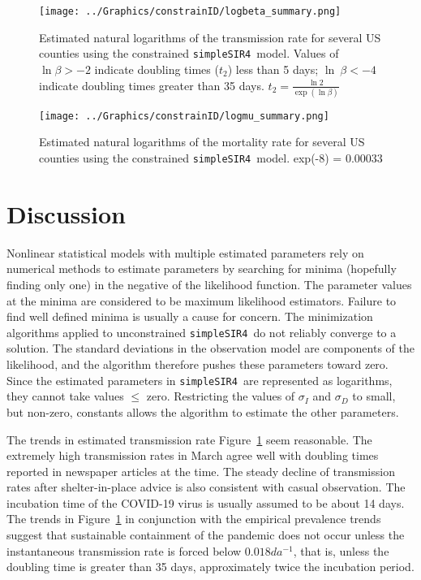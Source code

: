 \documentclass[12pt,letterpaper]{article}
\newcommand\help[1]{\color{Magenta}{\it #1 }\normalcolor}
\newcommand\SSm{{\tt simpleSIR4}}
\begin{document}
\begin{figure}
\begin{center}
\texttt{[image: ../Graphics/constrainID/logbeta\_summary.png]}\\
\end{center}
\caption{\label{fig:xrates}
Estimated natural logarithms of the transmission rate for several US counties using the
constrained \SSm\ model.
Values of $\ln \beta > -2$ indicate doubling times ($t_2$) less than 5 days;
$\ln~ \beta < -4$ indicate doubling times greater than 35 days.
$t_2 = \frac{\ln 2}{\exp(\ln \beta)}$
}
\end{figure}

\begin{figure}
\begin{center}
\texttt{[image: ../Graphics/constrainID/logmu\_summary.png]}\\
\end{center}
\caption{\label{fig:drates}
Estimated natural logarithms of the mortality rate for several US counties using the
constrained \SSm\ model.
exp(-8) = 0.00033
\help{Remove ToNY, Tompkins Co NY}
}
\end{figure}

\section*{Discussion}

Nonlinear statistical models with multiple estimated parameters rely
on numerical methods to estimate parameters by searching for minima
(hopefully finding only one) in the negative of the likelihood
function. The parameter values at the minima are considered to be
maximum likelihood estimators. Failure to find well defined minima is
usually a cause for concern. The minimization algorithms applied to
unconstrained \SSm\ do not reliably converge to a solution. The
standard deviations in the observation model are components of the
likelihood, and the algorithm therefore pushes these parameters toward zero.
Since the estimated parameters in \SSm\ are represented as logarithms,
they cannot take values $\le$ zero. Restricting the values of
$\sigma_I$ and $\sigma_D$ to small, but non-zero, constants allows the
algorithm to estimate the other parameters.

The trends in estimated transmission rate Figure~\ref{fig:xrates} seem
reasonable. The extremely high transmission rates in March agree well
with doubling times reported in newspaper articles at the time.
The steady decline of transmission rates after shelter-in-place advice is 
also consistent with casual observation.
The incubation time of the COVID-19 virus is usually assumed to be
about 14 days.
The trends in Figure~\ref{fig:xrates} in conjunction with the
empirical prevalence trends suggest that sustainable containment of
the pandemic does not occur unless the instantaneous transmission rate
is forced below $0.018 da^{-1}$, that is, unless the doubling time is greater
than 35 days, approximately twice the incubation period.
\end{document}
